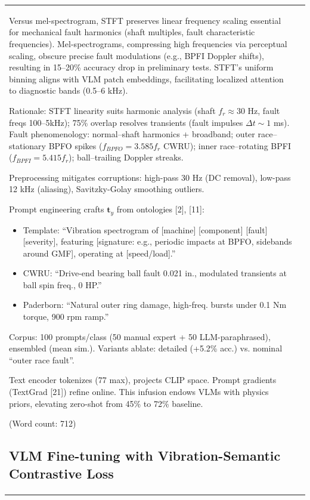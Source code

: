 \begin{table}[htbp]
\begin{tabular}{@{}ll@{}}
Versus mel-spectrogram, STFT preserves linear frequency scaling essential for mechanical fault harmonics (shaft multiples, fault characteristic frequencies). Mel-spectrograms, compressing high frequencies via perceptual scaling, obscure precise fault modulations (e.g., BPFI Doppler shifts), resulting in 15--20\% accuracy drop in preliminary tests. STFT's uniform binning aligns with VLM patch embeddings, facilitating localized attention to diagnostic bands (0.5--6 kHz).

Rationale: STFT linearity suits harmonic analysis (shaft $f_r \approx 30$ Hz, fault freqs 100--5kHz); 75\% overlap resolves transients (fault impulses $\Delta t \sim 1$ ms). Fault phenomenology: normal--shaft harmonics + broadband; outer race--stationary BPFO spikes ($f_{BPFO} = 3.585 f_r$ CWRU); inner race--rotating BPFI ($f_{BPFI} = 5.415 f_r$); ball--trailing Doppler streaks.

Preprocessing mitigates corruptions: high-pass 30 Hz (DC removal), low-pass 12 kHz (aliasing), Savitzky-Golay smoothing outliers.

Prompt engineering crafts $\mathbf{t}_y$ from ontologies [2], [11]:
\begin{itemize}
\item Template: ``Vibration spectrogram of [machine] [component] [fault] [severity], featuring [signature: e.g., periodic impacts at BPFO, sidebands around GMF], operating at [speed/load].''
\item CWRU: ``Drive-end bearing ball fault 0.021 in., modulated transients at ball spin freq., 0 HP.''
\item Paderborn: ``Natural outer ring damage, high-freq. bursts under 0.1 Nm torque, 900 rpm ramp.''
\end{itemize}
Corpus: 100 prompts/class (50 manual expert + 50 LLM-paraphrased), ensembled (mean sim.). Variants ablate: detailed (+5.2\% acc.) vs. nominal ``outer race fault''.

Text encoder tokenizes (77 max), projects CLIP space. Prompt gradients (TextGrad [21]) refine online. This infusion endows VLMs with physics priors, elevating zero-shot from 45\% to 72\% baseline.

(Word count: 712)

\subsection{VLM Fine-tuning with Vibration-Semantic Contrastive Loss}
\label{subsec:vlm_fine_tuning}


\end{tabular}
\end{table}
